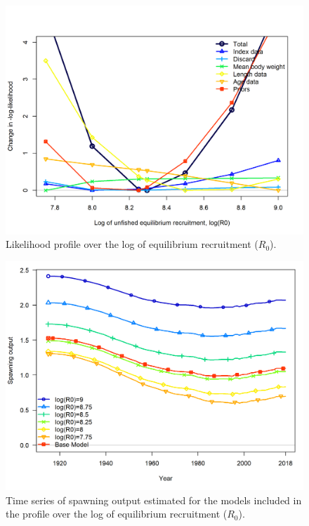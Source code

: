 \documentclass[12pt,]{article}
\begin{document}
\begin{figure}
\centering
\includegraphics{Figures/profile_logR0.png}
\caption{Likelihood profile over the log of equilibrium recruitment
(\(R_0\)).\label{fig:profile_logR0}}
\end{figure}

\begin{figure}
\centering
\includegraphics{Figures/profile_R0_compare1_spawnbio.png}
\caption{Time series of spawning output estimated for the models
included in the profile over the log of equilibrium recruitment
(\(R_0\)).\label{fig:profile_R0_compare1_spawnbio}}
\end{figure}
\end{document}
